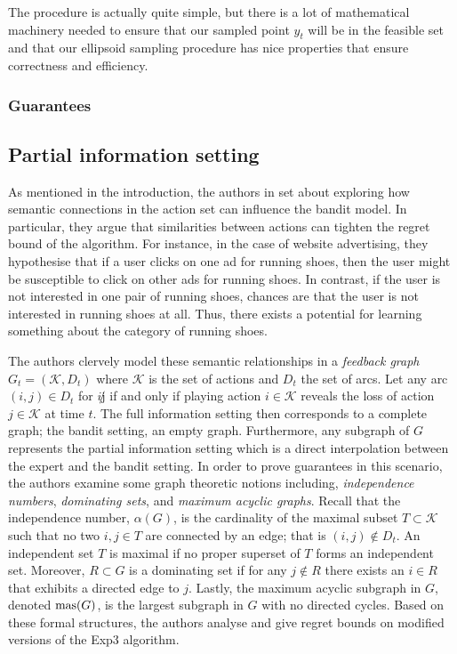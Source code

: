The procedure is actually quite simple, but there is a lot of mathematical machinery needed to
ensure that our sampled point $y_t$ will be in the feasible set and that our ellipsoid sampling
procedure has nice properties that ensure correctness and efficiency. 

\subsubsection{Guarantees}



\subsection{Partial information setting}
As mentioned in the introduction, the authors in \citep{alon} set about exploring how semantic connections in the action set can influence the bandit model. In particular, they argue that similarities between actions can tighten the regret bound of the algorithm. For instance, in the case of website advertising, they hypothesise that if a user clicks on one ad for running shoes, then the user might be susceptible to click on other ads for running shoes. In contrast, if the user is not interested in one pair of running shoes, chances are that the user is not interested in running shoes at all. Thus, there exists a potential for learning something about the category of running shoes. 

The authors clervely model these semantic relationships in a \textit{feedback graph} $G_t=(\mathcal{K},D_t)$ where $\mathcal{K}$ is the set of actions and $D_t$ the set of arcs. Let any arc $(i,j)\in D_t$ for $i\not j$ if and only if playing action $i\in\mathcal{K}$ reveals the loss of action $j\in \mathcal{K}$ at time $t$. The full information setting then corresponds to a complete graph; the bandit setting, an empty graph. Furthermore, any subgraph of $G$ represents the partial information setting which is a direct interpolation between the expert and the bandit setting. In order to prove guarantees in this scenario, the authors examine some graph theoretic notions including, \textit{independence numbers}, \textit{dominating sets}, and \textit{maximum acyclic graphs}. Recall that the independence number, $\alpha(G)$, is the cardinality of the maximal subset $T\subset \mathcal{K}$ such that no two $i,j\in T$ are connected by an edge; that is $(i,j)\not\in D_t$. An independent set $T$ is maximal if no proper superset of $T$ forms an independent set. Moreover, $R\subset G$ is a dominating set if for any $j\not\in R$ there exists an $i\in R$ that exhibits a directed edge to $j$. Lastly, the maximum acyclic subgraph in $G$, denoted $\text{mas}(G)$, is the largest subgraph in $G$ with no directed cycles. Based on these formal structures, the authors analyse and give regret bounds on modified versions of the Exp3 algorithm. 

